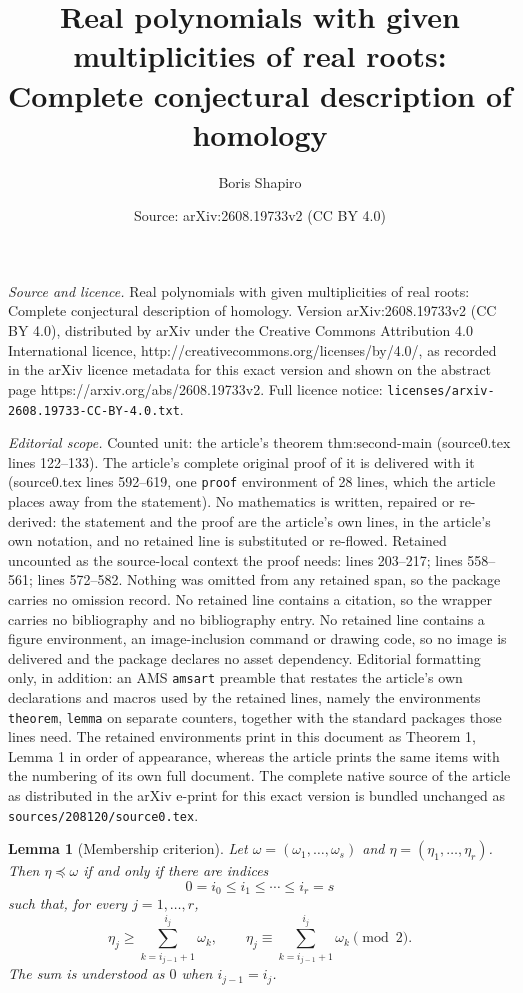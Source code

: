 \documentclass[10pt,a4paper]{amsart}
\title{Real polynomials with given multiplicities of real roots: Complete conjectural description of homology}
\author{Boris Shapiro}
\date{Source: arXiv:2608.19733v2 (CC BY 4.0)}
\newtheorem{lemma}{Lemma}
\begin{document}
\maketitle

\noindent\emph{Source and licence.} Real polynomials with given multiplicities of real roots: Complete conjectural description of homology. Version arXiv:2608.19733v2 (CC BY 4.0), distributed by arXiv under the Creative Commons Attribution 4.0 International licence, http://creativecommons.org/licenses/by/4.0/, as recorded in the arXiv licence metadata for this exact version and shown on the abstract page https://arxiv.org/abs/2608.19733v2. Full licence notice: \texttt{licenses/arxiv-2608.19733-CC-BY-4.0.txt}.\par\smallskip

\noindent\textit{Editorial scope.} Counted unit: the article's theorem thm:second-main (source0.tex lines 122--133). The article's complete original proof of it is delivered with it (source0.tex lines 592--619, one \texttt{proof} environment of 28 lines, which the article places away from the statement). No mathematics is written, repaired or re-derived: the statement and the proof are the article's own lines, in the article's own notation, and no retained line is substituted or re-flowed.  Retained uncounted as the source-local context the proof needs: lines 203--217; lines 558--561; lines 572--582.  Nothing was omitted from any retained span, so the package carries no omission record.  No retained line contains a citation, so the wrapper carries no bibliography and no bibliography entry.  No retained line contains a figure environment, an image-inclusion command or drawing code, so no image is delivered and the package declares no asset dependency.  Editorial formatting only, in addition: an AMS \texttt{amsart} preamble that restates the article's own declarations and macros used by the retained lines, namely the environments \texttt{theorem}, \texttt{lemma} on separate counters, together with the standard packages those lines need.  The retained environments print in this document as Theorem 1, Lemma 1 in order of appearance, whereas the article prints the same items with the numbering of its own full document.  The complete native source of the article as distributed in the arXiv e-print for this exact version is bundled unchanged as \texttt{sources/208120/source0.tex}.
\begin{lemma}[Membership criterion]\label{lem:membership}\label{lm:2.1}
Let $\omega=(\omega_1,\dots,\omega_s)$ and
$\eta=(\eta_1,\dots,\eta_r)$.  Then $\eta\preceq\omega$ if and only if there
are indices
\[
  0=i_0\le i_1\le\cdots\le i_r=s
\]
such that, for every $j=1,\dots,r$,
\[
  \eta_j\ge \sum_{k=i_{j-1}+1}^{i_j}\omega_k,
  \qquad
  \eta_j\equiv \sum_{k=i_{j-1}+1}^{i_j}\omega_k\pmod2.
\]
The sum is understood as $0$ when $i_{j-1}=i_j$.
\end{lemma}
\end{document}
